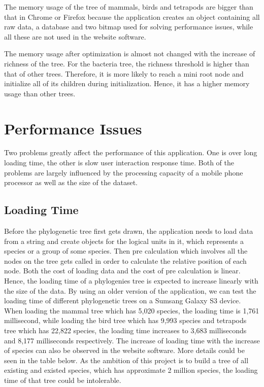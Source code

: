 \documentclass[a4paper,11pt,twoside]{report}
\begin{document}
The memory usage of the tree of mammals, birds and tetrapods are bigger than that in Chrome or Firefox because the application creates an object containing all raw data, a database and two bitmap used for solving performance issues, while all these are not used in the website software.

The memory usage after optimization is almost not changed with the increase of richness of the tree. For the bacteria tree, the richness threshold is higher than that of other trees. Therefore, it is more likely to reach a mini root node and initialize all of its children during initialization. Hence, it has a higher memory usage than other trees.

\chapter{Performance Issues}

Two problems greatly affect the performance of this application. One is over long loading time, the other is slow user interaction response time. Both of the problems are largely influenced by the processing capacity of a mobile phone processor as well as the size of the dataset. 

\section{Loading Time}

Before the phylogenetic tree first gets drawn, the application needs to load data from a string and create objects for the logical units in it, which represents a species or a group of some species. Then pre calculation which involves all the nodes on the tree gets called in order to calculate the relative position of each node. Both the cost of loading data and the cost of pre calculation is linear. Hence, the loading time of a phylogenies tree is expected to increase linearly with the size of the data. By using an older version of the application, we can test the loading time of different phylogenetic trees on a Sumsang Galaxy S3 device. When loading the mammal tree which has 5,020 species, the loading time is 1,761 millisecond, while loading the bird tree which has 9,993 species and tetrapods tree which has 22,822 species, the loading time increases to 3,683 milliseconds and 8,177 milliseconds respectively. The increase of loading time with the increase of species can also be observed in the website software. More details could be seen in the table below. As the ambition of this project is to build a tree of all existing and existed species, which has approximate 2 million species, the loading time of that tree could be intolerable.
\end{document}
